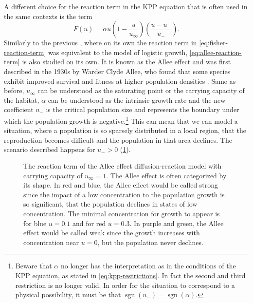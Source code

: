 A different choice for the reaction term in the \ac{KPP} equation that is often used in the same contexts is the term
    \begin{equation}
        \label{eq:allee-reaction-term}
        F(u) = \alpha u \left(1 - \frac{u}{u_\infty}\right)\left(\frac{u - u_{-}}{u_{-}}\right).
    \end{equation}
Similarly to the previous , where on its own the reaction term in 
    \cref{eq:fisher-reaction-term} was equivalent to the model of logistic growth, \cref{eq:allee-reaction-term} is
    also studied on its own.
It is known as the Allee effect and was first described in the 1930s by Warder Clyde Allee, who found that some species 
    exhibit improved survival and fitness at higher population densities \cite{wikipedia-Allee-effect}.
Same as before, \(u_{\infty}\) can be understood as the saturating point or the carrying capacity of the habitat,
    \(\alpha\) can be understood as the intrinsic growth rate and the new coefficient \(u_{-}\) is the critical
    population size and represents the boundary under which the population growth is negative.\footnote{%
    Beware that \(\alpha\) no longer has the interpretation as in the conditions of the \ac{KPP} equation, as stated in 
        \cref{eq:kpp-restrictions}.
    In fact the second and third restriction is no longer valid.
    In order for the situation to correspond to a physical possibility, it must be that \(\mathop{sgn}(u_{-}) = 
        \mathop{sgn}(\alpha).\)
    }
This can mean that we can model a situation, where a population is so sparsely distributed in a local region, that the
    reproduction becomes difficult and the population in that area declines.
    The scenario described happens for \(u_{-} > 0\) (\cref{fig:allee-effect-reaction-term}).

\begin{figure}[htbp]
    \centering
    
    \caption{
        The reaction term of the Allee effect diffusion-reaction model with carrying capacity of \(u_{\infty} = 1\).
        The Allee effect is often categorized by its shape.
        In red and blue, the Allee effect would be called strong since the impact of a low concentration to the 
            population growth is so significant, that the population declines in states of low concentration.
        The minimal concentration for growth to appear is for blue \(u = 0.1\) and for red \(u = 0.3\).
        In purple and green, the Allee effect would be called weak since the growth increases with concentration near \(u
            = 0\), but the population never declines.
    }
    \label{fig:allee-effect-reaction-term}
\end{figure}

